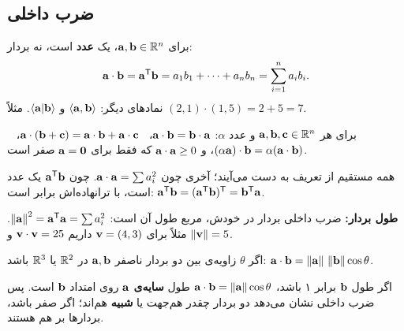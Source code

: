 \subsection{ضرب داخلی}
\begin{definition}
برای $\mathbf{a},\mathbf{b}\in\mathbb{R}^n$،  یک \textbf{عدد} است، نه بردار:
\[
\mathbf{a}\cdot\mathbf{b}=\mathbf{a}^{\mathsf{T}}\mathbf{b}=a_1b_1+\dots+a_nb_n=\sum_{i=1}^n a_ib_i .
\]
نمادهای دیگر: $\left\langle \mathbf{a},\mathbf{b}\right\rangle$ و $\langle\mathbf{a}|\mathbf{b}\rangle$. مثلاً $(2,1)\cdot(1,5)=2+5=7$.
\end{definition}

\begin{theorem}\label{thm:dot-props}
برای هر $\mathbf{a},\mathbf{b},\mathbf{c}\in\mathbb{R}^n$ و عدد $\alpha$:
$\mathbf{a}\cdot\mathbf{b}=\mathbf{b}\cdot\mathbf{a}$، \ $\mathbf{a}\cdot(\mathbf{b}+\mathbf{c})=\mathbf{a}\cdot\mathbf{b}+\mathbf{a}\cdot\mathbf{c}$، \ $(\alpha\mathbf{a})\cdot\mathbf{b}=\alpha(\mathbf{a}\cdot\mathbf{b})$، و $\mathbf{a}\cdot\mathbf{a}\ge0$ که فقط برای $\mathbf{a}=\mathbf{0}$ صفر است.
\end{theorem}
همه مستقیم از تعریف به دست می‌آیند؛ آخری چون $\mathbf{a}\cdot\mathbf{a}=\sum a_i^2$. چون $\mathbf{a}^{\mathsf{T}}\mathbf{b}$ یک عدد است، با ترانهاده‌اش برابر است: $\mathbf{a}^{\mathsf{T}}\mathbf{b}=(\mathbf{a}^{\mathsf{T}}\mathbf{b})^{\mathsf{T}}=\mathbf{b}^{\mathsf{T}}\mathbf{a}$.

\textbf{طول بردار:} ضرب داخلی بردار در خودش، مربع طول آن است:
$\left\lVert \mathbf{a}\right\rVert^2=\mathbf{a}^{\mathsf{T}}\mathbf{a}=\sum a_i^2$. مثلاً برای $\mathbf{v}=(4,3)$ داریم $\mathbf{v}\cdot\mathbf{v}=25$ و $\left\lVert \mathbf{v}\right\rVert=5$.

\begin{theorem}\label{thm:dot-angle}
اگر $\theta$ زاویه‌ی بین دو بردار ناصفر $\mathbf{a},\mathbf{b}$ در $\mathbb{R}^2$ یا $\mathbb{R}^3$ باشد:
$\mathbf{a}\cdot\mathbf{b}=\left\lVert \mathbf{a}\right\rVert\,\left\lVert \mathbf{b}\right\rVert\cos\theta$.
\end{theorem}

\begin{intuition}[سایه]
اگر طول $\mathbf{b}$ برابر ۱ باشد، $\mathbf{a}\cdot\mathbf{b}=\left\lVert \mathbf{a}\right\rVert\cos\theta$ طول \textbf{سایه‌ی} $\mathbf{a}$ روی امتداد $\mathbf{b}$ است. پس ضرب داخلی نشان می‌دهد دو بردار چقدر هم‌جهت یا \textbf{شبیه} هم‌اند؛ اگر صفر باشد، بردارها بر هم  هستند.
\begin{center}
\end{center}
\end{intuition}

